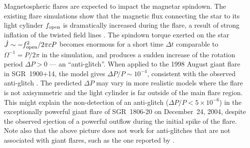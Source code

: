 Magnetospheric flares are expected to impact the magnetar spindown.
The existing flare simulations show that the magnetic flux connecting 
the star to its light cylinder $f_{\rm open}$ is dramatically increased during the flare, 
a result of strong inflation of the twisted field lines \citep{pbh13}. 
The spindown torque exerted on the star $\dot{J}\sim-f_{\rm open}^2/2\pi c P$ 
becomes enormous for a short time $\Delta t$ comparable to $\Omega^{-1}=P/2\pi$ in 
the simulation, and produces a sudden increase of the 
rotation period $\Delta P>0$ --- an ``anti-glitch''.
When applied to the 1998 August giant flare in SGR~1900+14, the model gives
$\Delta P/P\sim 10^{-4}$, consistent with the observed anti-glitch \citep{wkv+99}.
The predicted $\Delta P$ may vary in more realistic models 
where the flare is not axisymmetric and the light cylinder is far outside of the main 
flare region. This might explain the non-detection of an anti-glitch 
($\Delta P/P<5\times 10^{-6}$) in the exceptionally powerful giant flare of SGR~1806-20 
on December~24, 2004, despite 
the observed ejection of a powerful outflow during the initial spike of the flare. 
Note also that the above picture does not work for anti-glitches that are not associated 
with giant flares, such as the one reported by \citet{akn+13}.


%


%
%

